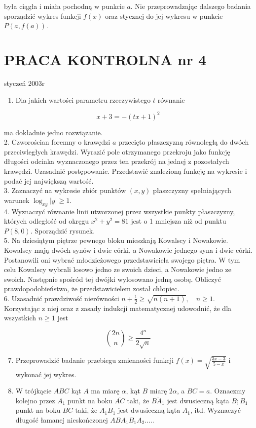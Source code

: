 \documentclass[10pt]{article}
\begin{document}
była ciągła i miała pochodną w punkcie $a$. Nie przeprowadzając dalszego badania sporządzić wykres funkcji $f(x)$ oraz stycznej do jej wykresu w punkcie $P(a, f(a))$.

\section*{PRACA KONTROLNA nr 4}
styczeń 2003r

\begin{enumerate}
  \item Dla jakich wartości parametru rzeczywistego $t$ równanie
\end{enumerate}

$$
x+3=-(t x+1)^{2}
$$

ma dokładnie jedno rozwiązanie.\\
2. Czworościan foremny o krawędzi $a$ przecięto płaszczyzną równoległą do dwóch przeciwległych krawędzi. Wyrazić pole otrzymanego przekroju jako funkcję długości odcinka wyznaczonego przez ten przekrój na jednej z pozostałych krawędzi. Uzasadnić postępowanie. Przedstawić znalezioną funkcję na wykresie i podać jej największą wartość.\\
3. Zaznaczyć na wykresie zbiór punktów $(x, y)$ płaszczyzny spełniających warunek $\log _{x y}|y| \geqslant 1$.\\
4. Wyznaczyć równanie linii utworzonej przez wszystkie punkty płaszczyzny, których odległość od okręgu $x^{2}+y^{2}=81$ jest o 1 mniejsza niż od punktu $P(8,0)$. Sporządzić rysunek.\\
5. Na dziesiątym piętrze pewnego bloku mieszkają Kowalscy i Nowakowie. Kowalscy mają dwóch synów i dwie córki, a Nowakowie jednego syna i dwie córki. Postanowili oni wybrać młodzieżowego przedstawiciela swojego piętra. W tym celu Kowalscy wybrali losowo jedno ze swoich dzieci, a Nowakowie jedno ze swoich. Następnie spośród tej dwójki wylosowano jedną osobę. Obliczyć prawdopodobieństwo, że przedstawicielem został chłopiec.\\
6. Uzasadnić prawdziwość nierówności $n+\frac{1}{2} \geqslant \sqrt{n(n+1)}, \quad n \geqslant 1$. Korzystając z niej oraz z zasady indukcji matematycznej udowodnić, że dla wszystkich $n \geqslant 1$ jest

$$
\binom{2 n}{n} \geqslant \frac{4^{n}}{2 \sqrt{n}}
$$

\begin{enumerate}
  \setcounter{enumi}{6}
  \item Przeprowadzić badanie przebiegu zmienności funkcji $f(x)=\sqrt{\frac{3 x-3}{5-x}}$ i wykonać jej wykres.
  \item W trójkącie $A B C$ kąt $A$ ma miarę $\alpha$, kąt $B$ miarę $2 \alpha$, a $B C=a$. Oznaczmy kolejno przez $A_{1}$ punkt na boku $\overline{A C}$ taki, że $\overline{B A_{1}}$ jest dwusieczną kąta $B ; B_{1}$ punkt na boku $\overline{B C}$ taki, że $\overline{A_{1} B_{1}}$ jest dwusieczną kąta $A_{1}$, itd. Wyznaczyć długość łamanej nieskończonej $A B A_{1} B_{1} A_{2} \ldots$..
\end{enumerate}
\end{document}

